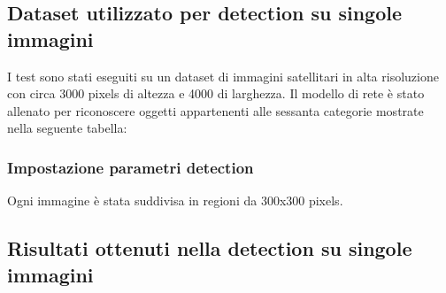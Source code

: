 \subsection{Dataset utilizzato per detection su singole immagini}
I test sono stati eseguiti su un dataset di immagini satellitari in alta risoluzione con circa 3000 pixels di altezza e 4000 di larghezza. Il modello di rete è stato allenato per riconoscere oggetti appartenenti alle sessanta categorie mostrate nella seguente tabella:

\subsubsection{Impostazione parametri detection}
Ogni immagine è stata suddivisa in regioni da 300x300 pixels.

\subsection{Risultati ottenuti nella detection su singole immagini}

